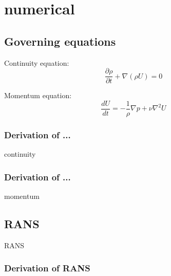 
\chapter{numerical} %

\label{numerical} %


\newcommand{\keyword}[1]{\textbf{#1}}
\newcommand{\tabhead}[1]{\textbf{#1}}
\newcommand{\code}[1]{\texttt{#1}}
\newcommand{\file}[1]{\texttt{\bfseries#1}}
\newcommand{\option}[1]{\texttt{\itshape#1}}



\section{Governing equations}

Continuity equation:
\begin{equation} \label{eq:cont}
\frac{\partial \rho}{\partial t} + \nabla (\rho U) = 0
\end{equation}

Momentum equation:
\begin{equation} \label{eq:momentum}
\frac{dU}{dt} = - \frac{1}{\rho} \nabla p + \nu \nabla^{2} U
\end{equation}

\subsection{Derivation of ...}

continuity

\subsection{Derivation of ...}

momentum


\section{RANS}

RANS

\subsection{Derivation of RANS}

